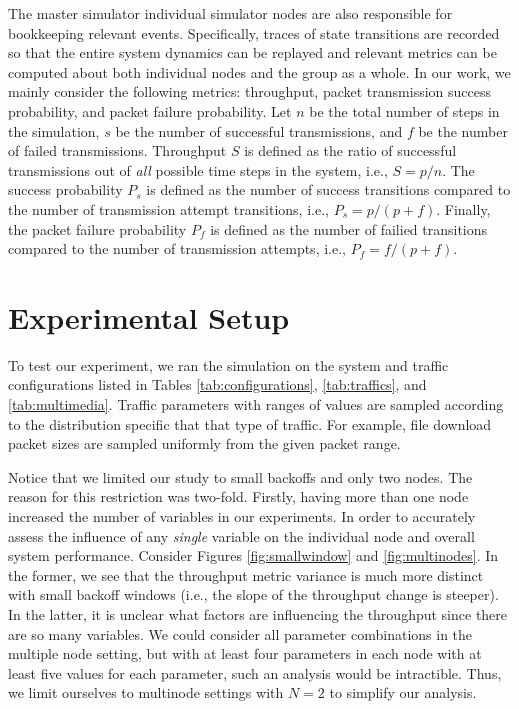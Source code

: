 \documentclass{llncs}
\begin{document}
The master simulator individual simulator nodes are also responsible for bookkeeping relevant events. Specifically, traces of state transitions are recorded so that the entire system dynamics can be replayed and relevant metrics can be computed about both individual nodes and the group as a whole. In our work, we mainly consider the following metrics: throughput, packet transmission success probability, and packet failure probability. Let $n$ be the total number of steps in the simulation, $s$ be the number of successful transmissions, and $f$ be the number of failed transmissions. Throughput $S$ is defined as the ratio of successful transmissions out of \emph{all} possible time steps in the system, i.e., $S = p / n$. The success probability $P_s$ is defined as the number of success transitions compared to the number of transmission attempt transitions, i.e., $P_s = p / (p + f)$. Finally, the packet failure probability $P_f$ is defined as the number of failied transitions compared to the number of transmission attempts, i.e., $P_f = f / (p + f)$. 

\section{Experimental Setup} \label{sec:experiment}
To test our experiment, we ran the simulation on the system and traffic configurations listed in Tables \ref{tab:configurations}, \ref{tab:traffics}, and \ref{tab:multimedia}. Traffic parameters with ranges of values are sampled according to the distribution specific that that type of traffic. For example, file download packet sizes are sampled uniformly from the given packet range. 

Notice that we limited our study to small backoffs and only two nodes. The reason for this restriction was two-fold. Firstly, having more than one node increased the number of variables in our experiments. In order to accurately assess the influence of any \emph{single} variable on the individual node and overall system performance. Consider Figures \ref{fig:smallwindow} and \ref{fig:multinodes}. In the former, we see that the throughput metric variance is much more distinct with small backoff windows (i.e., the slope of the throughput change is steeper). In the latter, it is unclear what factors are influencing the throughput since there are so many variables. We could consider all parameter combinations in the multiple node setting, but with at least four parameters in each node with at least five values for each parameter, such an analysis would be intractible. Thus, we limit ourselves to multinode settings with $N = 2$ to simplify our analysis. 
\end{document}
